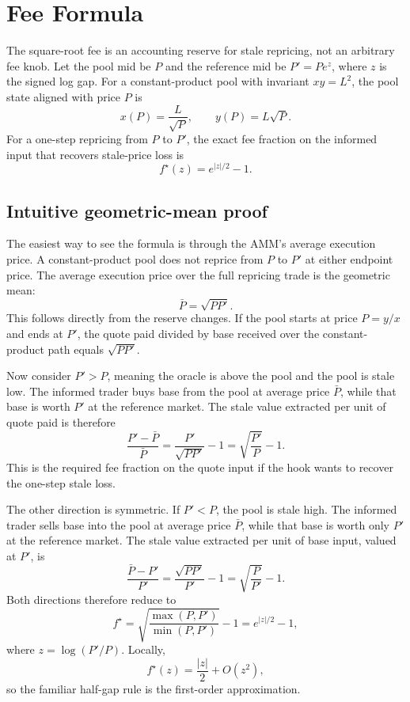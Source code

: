 \documentclass[11pt]{article}
\begin{document}
\section{Fee Formula}
The square-root fee is an accounting reserve for stale repricing, not an arbitrary fee knob. Let the pool mid be \(P\) and the reference mid be \(P' = P e^z\), where \(z\) is the signed log gap. For a constant-product pool with invariant \(xy=L^2\), the pool state aligned with price \(P\) is
\[
x(P) = \frac{L}{\sqrt{P}},
\qquad
y(P) = L\sqrt{P}.
\]
For a one-step repricing from \(P\) to \(P'\), the exact fee fraction on the informed input that recovers stale-price loss is
\[
f^\star(z) = e^{|z|/2} - 1.
\]

\subsection{Intuitive geometric-mean proof}
The easiest way to see the formula is through the AMM's average execution price. A constant-product pool does not reprice from \(P\) to \(P'\) at either endpoint price. The average execution price over the full repricing trade is the geometric mean:
\[
\bar P = \sqrt{P P'}.
\]
This follows directly from the reserve changes. If the pool starts at price \(P=y/x\) and ends at \(P'\), the quote paid divided by base received over the constant-product path equals \(\sqrt{PP'}\).

Now consider \(P'>P\), meaning the oracle is above the pool and the pool is stale low. The informed trader buys base from the pool at average price \(\bar P\), while that base is worth \(P'\) at the reference market. The stale value extracted per unit of quote paid is therefore
\[
\frac{P' - \bar P}{\bar P}
=
\frac{P'}{\sqrt{P P'}} - 1
=
\sqrt{\frac{P'}{P}} - 1.
\]
This is the required fee fraction on the quote input if the hook wants to recover the one-step stale loss.

The other direction is symmetric. If \(P'<P\), the pool is stale high. The informed trader sells base into the pool at average price \(\bar P\), while that base is worth only \(P'\) at the reference market. The stale value extracted per unit of base input, valued at \(P'\), is
\[
\frac{\bar P - P'}{P'}
=
\frac{\sqrt{P P'}}{P'} - 1
=
\sqrt{\frac{P}{P'}} - 1.
\]
Both directions therefore reduce to
\[
f^\star
=
\sqrt{\frac{\max(P,P')}{\min(P,P')}} - 1
=
e^{|z|/2}-1,
\]
where \(z=\log(P'/P)\). Locally,
\[
f^\star(z) = \frac{|z|}{2} + O(z^2),
\]
so the familiar half-gap rule is the first-order approximation.
\end{document}
